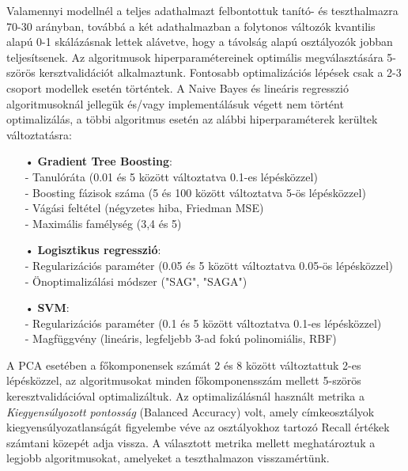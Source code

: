 \documentclass[12pt]{article}
\begin{document}
Valamennyi modellnél a teljes adathalmazt felbontottuk tanító- és teszthalmazra 70-30 arányban, továbbá a két adathalmazban a folytonos változók kvantilis alapú 0-1 skálázásnak lettek alávetve, hogy a távolság alapú osztályozók jobban teljesítsenek. Az algoritmusok hiperparamétereinek optimális megválasztására 5-szörös kersztvalidációt alkalmaztunk.  Fontosabb optimalizációs lépések csak a 2-3 csoport modellek esetén történtek. A Naive Bayes és lineáris regresszió algoritmusoknál jellegük és/vagy implementálásuk végett nem történt optimalizálás, a többi algoritmus esetén az alábbi hiperparaméterek kerültek változtatásra:
\begin{itemize}
\item[•] \textbf{Gradient Tree Boosting}: \\
- Tanulóráta (0.01 és 5 között változtatva 0.1-es lépésközzel)\\
- Boosting fázisok száma (5 és 100 között változtatva 5-ös lépésközzel)\\
- Vágási feltétel (négyzetes hiba, Friedman MSE) \\
- Maximális famélység (3,4 és 5)
\item[•] \textbf{Logisztikus regresszió}: \\
- Regularizációs paraméter (0.05 és 5 között változtatva 0.05-ös lépésközzel) \\
- Önoptimalizálási módszer ("SAG", "SAGA") 
\item[•] \textbf{SVM}: \\
- Regularizációs paraméter (0.1 és 5 között változtatva 0.1-es lépésközzel)\\
- Magfüggvény (lineáris, legfeljebb 3-ad fokú polinomiális, RBF)
\end{itemize}A PCA esetében a főkomponensek számát 2 és 8 között változtattuk 2-es lépésközzel, az algoritmusokat minden főkomponensszám mellett 5-szörös keresztvalidációval optimalizáltuk. Az optimalizálásnál használt metrika a \textit{Kiegyensúlyozott pontosság} (Balanced Accuracy) volt, amely címkeosztályok kiegyensúlyozatlanságát figyelembe véve az osztályokhoz tartozó Recall értékek számtani közepét adja vissza. A választott metrika mellett meghatároztuk a legjobb algoritmusokat, amelyeket a teszthalmazon visszamértünk.
\end{document}
